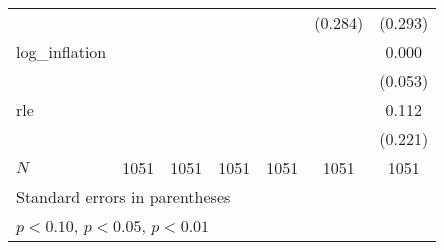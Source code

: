 {\begin{tabular}{l*{6}{c}}
            &                     &                     &                     &                     &     (0.284)         &     (0.293)         \\
\addlinespace
log\_inflation&                     &                     &                     &                     &                     &       0.000         \\
            &                     &                     &                     &                     &                     &     (0.053)         \\
\addlinespace
rle         &                     &                     &                     &                     &                     &       0.112         \\
            &                     &                     &                     &                     &                     &     (0.221)         \\
\midrule
\(N\)       &        1051         &        1051         &        1051         &        1051         &        1051         &        1051         \\
\bottomrule
\multicolumn{7}{l}{\footnotesize Standard errors in parentheses}\\
\multicolumn{7}{l}{\footnotesize \sym{*} \(p<0.10\), \sym{**} \(p<0.05\), \sym{***} \(p<0.01\)}\\
\end{tabular}
}
